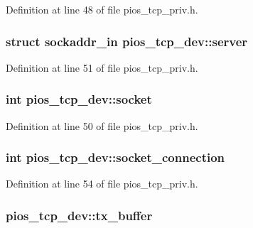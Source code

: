 Definition at line 48 of file pios\-\_\-tcp\-\_\-priv.\-h.

\hypertarget{structpios__tcp__dev_af1058d8aa314e89f68108d5f8c7c1a89}{
\subsubsection[{server}]{\setlength{\rightskip}{0pt plus 5cm}struct sockaddr\-\_\-in pios\-\_\-tcp\-\_\-dev\-::server}}\label{structpios__tcp__dev_af1058d8aa314e89f68108d5f8c7c1a89}


Definition at line 51 of file pios\-\_\-tcp\-\_\-priv.\-h.

\hypertarget{structpios__tcp__dev_ae7dc9c46e8630826bbce88df658dbf65}{
\subsubsection[{socket}]{\setlength{\rightskip}{0pt plus 5cm}int pios\-\_\-tcp\-\_\-dev\-::socket}}\label{structpios__tcp__dev_ae7dc9c46e8630826bbce88df658dbf65}


Definition at line 50 of file pios\-\_\-tcp\-\_\-priv.\-h.

\hypertarget{structpios__tcp__dev_a8527742023dc82cbba21ba4bc3e9e787}{
\subsubsection[{socket\-\_\-connection}]{\setlength{\rightskip}{0pt plus 5cm}int pios\-\_\-tcp\-\_\-dev\-::socket\-\_\-connection}}\label{structpios__tcp__dev_a8527742023dc82cbba21ba4bc3e9e787}


Definition at line 54 of file pios\-\_\-tcp\-\_\-priv.\-h.

\hypertarget{structpios__tcp__dev_a58bf5c1b8a6d9ef9d7ffc739387f0069}{
\subsubsection[{tx\-\_\-buffer}]{ pios\-\_\-tcp\-\_\-dev\-::tx\-\_\-buffer}}\label{structpios__tcp__dev_a58bf5c1b8a6d9ef9d7ffc739387f0069}


